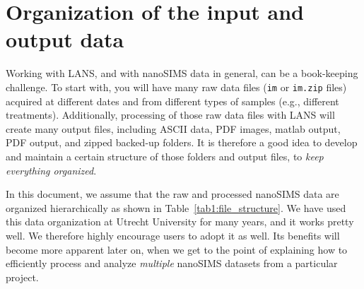 \documentclass[a4paper, 11pt]{article}
\newcommand{\ttt}[1]{\texttt{#1}}
\begin{document}

\section{Organization of the input and output data}
\label{sec:data_organization}

Working with LANS, and with nanoSIMS data in general, can be a book-keeping challenge. To start with, you will have many raw data files (\ttt{im} or \ttt{im.zip} files) acquired at different dates and from different types of samples (e.g., different treatments). Additionally, processing of those raw data files with LANS will create many output files, including ASCII data, PDF images, matlab output, PDF output, and zipped backed-up folders. It is therefore a good idea to develop and maintain a certain structure of those folders and output files, to \emph{keep everything organized}. 

In this document, we assume that the raw and processed nanoSIMS data are organized hierarchically as shown in Table~\ref{tab1:file_structure}. We have used this data organization at Utrecht University for many years, and it works pretty well. We therefore highly encourage users to adopt it as well. Its benefits will become more apparent later on, when we get to the point of explaining how to efficiently process and analyze \emph{multiple} nanoSIMS datasets from a particular project.
\end{document}
